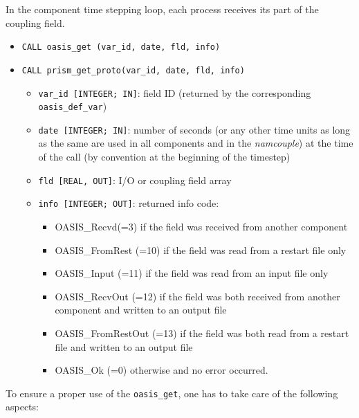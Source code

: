 In the component time stepping loop, each process receives its part of the
coupling field.

\begin{itemize}
 
\item {\tt CALL oasis\_get (var\_id, date, fld, info)}
\item {\tt CALL prism\_get\_proto(var\_id, date, fld, info)}
  \begin{itemize}
  \item {\tt var\_id [INTEGER; IN]}: field ID (returned by the corresponding
    {\tt oasis\_def\_var})
  \item {\tt date [INTEGER; IN]}: number of seconds (or any other time
    units as long as the same are used in all components and in the {\it
      namcouple}) at the time of the call (by convention at the
    beginning of the timestep)
  \item {\tt fld [REAL, OUT]}: I/O or coupling field array
  \item {\tt info [INTEGER; OUT]}: returned info code:
    \begin{itemize}
    \item OASIS\_Recvd(=3) if the field was received from another
      component
    \item OASIS\_FromRest (=10) if the field was read from a restart
      file only
    \item OASIS\_Input (=11) if the field was read from an input file
      only
    \item OASIS\_RecvOut (=12) if the field was both received from
      another component and written to an output file
    \item OASIS\_FromRestOut (=13) if the field was both read from a
      restart file and written to an output file
    \item OASIS\_Ok (=0) otherwise and no error occurred.
    \end{itemize}
  \end{itemize}
\end{itemize}

To ensure a proper use of the {\tt oasis\_get}, one has to take care of the following aspects:

